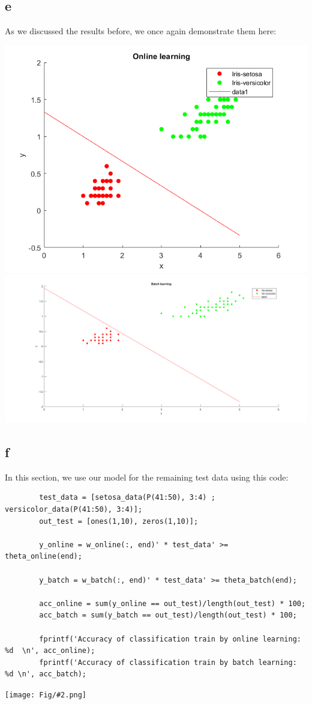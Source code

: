 \documentclass[]{article}
\newcommand{\pict}[2]{\begin{center}
		\texttt{[image: Fig/\#2.png]}
\end{center}}
\begin{document}
	\subsection*{e}
	As we discussed the results before, we once again demonstrate them here:
	\begin{center}
		\includegraphics[width=0.3\linewidth]{Fig/Q2_F3.png}
		\qquad\qquad
		\includegraphics[width=0.5\linewidth]{Fig/Q2_F4.png}
	\end{center}

	\subsection*{f}
	In this section, we use our model for the remaining test data using this code:
	\begin{lstlisting}
		test_data = [setosa_data(P(41:50), 3:4) ; versicolor_data(P(41:50), 3:4)];
		out_test = [ones(1,10), zeros(1,10)];
		
		y_online = w_online(:, end)' * test_data' >= theta_online(end);
		
		y_batch = w_batch(:, end)' * test_data' >= theta_batch(end);
		
		acc_online = sum(y_online == out_test)/length(out_test) * 100;
		acc_batch = sum(y_batch == out_test)/length(out_test) * 100;
		
		fprintf('Accuracy of classification train by online learning: %d  \n', acc_online);
		fprintf('Accuracy of classification train by batch learning: %d \n', acc_batch);
	\end{lstlisting}
	\pict{1}{Q2_F8}
	
\end{document}
